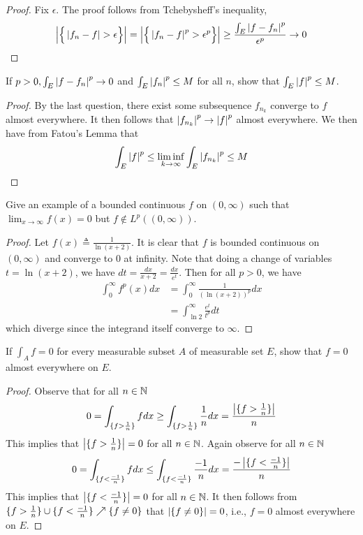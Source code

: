 \documentclass{report}
\begin{document}
\begin{proof}
Fix $\epsilon $. The proof follows from Tchebysheff's inequality, 
\begin{align*}
\abso{\bset{\abso{f_n-f}>\epsilon }}= \abso{\bset{\abso{f_n-f}^p > \epsilon ^p}}  \geq  \frac{\int_E \abso{f-f_n}^p}{\epsilon^p }\to 0
\end{align*}
\end{proof}
\begin{question}{}{}
If $p>0, \int_E \left|f-f_n\right|^p \to 0$ and $\int_E \left|f_n\right|^p \leq M$ for all $n$, show that  $\int_E \left|f\right|^p \leq M$. 
\end{question}
\begin{proof}
By the last question, there exist some subsequence $f_{n_k}$ converge to $f$ almost everywhere. It then follows that $\left|f_{n_k}\right|^p \to \left|f\right|^p$ almost everywhere. We then have from Fatou's Lemma that 
\begin{align*}
\int_E \left|f\right|^p \leq \liminf_{k\to\infty} \int_E \left|f_{n_k}\right|^p \leq M
\end{align*}
\end{proof}
\begin{question}{}{}
Give an example of a bounded continuous $f$ on $(0,\infty)$ such that $\lim_{x\to \infty}f(x)=0$ but $f\not\in L^p((0,\infty))$. 
\end{question}
\begin{proof}
Let $f(x)\triangleq \frac{1}{\ln (x+2)}$. It is clear that $f$ is bounded continuous on  $(0,\infty)$ and converge to $0$ at infinity. Note that doing a change of variables $t=\ln (x+2)$, we have $dt=\frac{dx}{x+2}= \frac{dx}{e^t}$. Then for all $p>0$, we have
\begin{align*}
\int_0^{\infty} f^p(x)dx&= \int_0^{\infty} \frac{1}{(\ln (x+2))^p}dx \\
&= \int_{\ln 2}^{\infty} \frac{e^t}{t^p}dt
\end{align*}
which diverge since the integrand itself converge to $\infty$.  
\end{proof}
\begin{question}{}{}
If $\int_A f=0$ for every measurable subset $A$ of measurable set  $E$, show that  $f=0$ almost everywhere on  $E$. 
\end{question}
\begin{proof}
 Observe that for all $n\in\mathbb{N}$ 
 \begin{align*}
 0=\int_{\{ f>\frac{1}{n} \}}fdx\geq \int_{{\{ f>\frac{1}{n} \}}} \frac{1}{n}dx= \frac{\left|\{ f>\frac{1}{n} \}\right|}{n}
 \end{align*}
 This implies that $\left|\{ f>\frac{1}{n} \}\right|=0$ for all $n\in\mathbb{N}$. Again observe for all $n\in\mathbb{N}$ 
\begin{align*}
 0=\int_{\{ f<\frac{-1}{n} \}}fdx\leq  \int_{{\{ f<\frac{-1}{n} \}}} \frac{-1}{n}dx= \frac{-\left|\{ f<\frac{-1}{n} \}\right|}{n}
\end{align*}
This implies that $\left|\{ f< \frac{-1}{n} \}\right|=0$ for all $n\in\mathbb{N}$. It then follows from $\{ f>\frac{1}{n} \} \cup \{ f< \frac{-1}{n} \}\nearrow \{ f\neq 0 \}$ that $\left|\{ f\neq 0 \}\right|=0$, i.e., $f=0$ almost everywhere on $E$.  
\end{proof}
\end{document}

